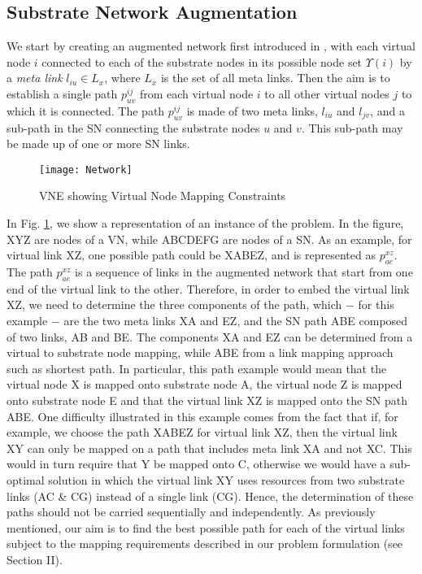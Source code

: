 \documentclass[journal]{IEEEtran}
\begin{document}
\subsection{Substrate Network Augmentation}
We start by creating an augmented network first introduced in \cite{Chowdhury12},  with each virtual node $i$ connected to each of the substrate nodes in its possible node set $\Upsilon(i)$ by a \emph{meta link} \cite{Chowdhury12} $l_{iu} \in L_x$, where $L_x$ is the set of all meta links. Then the aim is to establish a single path ${p_{uv}^{ij}}$ from each virtual node $i$ to all other virtual nodes $j$ to which it is connected. The path ${p_{uv}^{ij}}$ is made of two meta links, $l_{iu}$ and $l_{jv}$, and a sub-path in the \ac{SN} connecting the substrate nodes $u$ and $v$. This sub-path may be made up of one or more \ac{SN} links.
\begin{figure}
\centering
  {\texttt{[image: Network]}}
  \caption{VNE showing Virtual Node Mapping Constraints}
  \label{Diagram}
\end{figure}
In Fig. \ref{Diagram}, we show a representation of an instance of the problem. In the figure, XYZ are nodes of a \ac{VN}, while ABCDEFG are nodes of a \ac{SN}. As an example, for virtual link XZ, one possible path could be XABEZ, and is represented as ${p_{ae}^{xz}}$. The path ${p_{ae}^{xz}}$ is a sequence of links in the augmented network that start from one end of the virtual link to the other. Therefore, in order to embed the virtual link XZ, we need to determine the three components of the path, which $-$ for this example $-$ are the two meta links XA and EZ, and the \ac{SN} path ABE composed of two links, AB and BE. The components XA and EZ can be determined from a virtual to substrate node mapping, while ABE from a link mapping approach such as shortest path. In particular, this path example would mean that the virtual node X is mapped onto substrate node A, the virtual node Z is mapped onto substrate node E and that the virtual link XZ is mapped onto the \ac{SN} path ABE. One difficulty illustrated in this example comes from the fact that if, for example, we choose the path XABEZ for virtual link XZ, then the virtual link XY can only be mapped on a path that includes meta link XA and not XC. This would in turn require that Y be mapped onto C, otherwise we would have a sub-optimal solution in which the virtual link XY uses resources from two substrate links (AC \& CG) instead of a single link (CG). Hence, the determination of these paths should not be carried sequentially and independently. As previously mentioned, our aim is to find the best possible path for each of the virtual links subject to the mapping requirements described in our problem formulation (see Section II).
\end{document}
